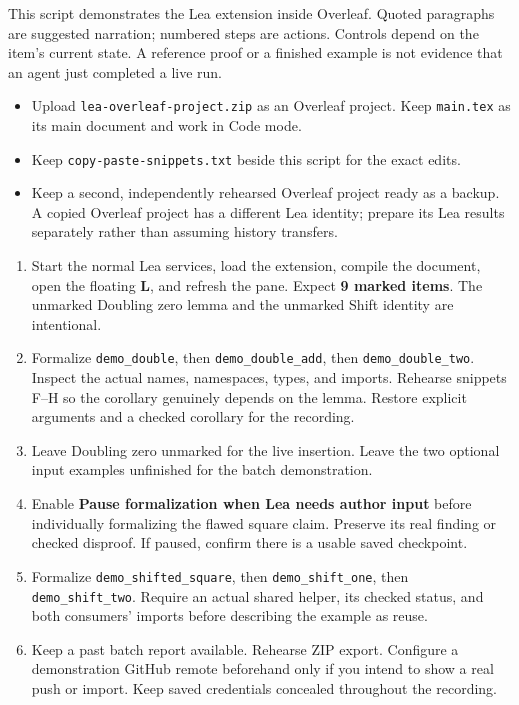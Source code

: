 
This script demonstrates the Lea extension inside Overleaf. Quoted paragraphs
are suggested narration; numbered steps are actions. Controls depend on the
item's current state. A reference proof or a finished example is not evidence
that an agent just completed a live run.

\begin{itemize}
  \item Upload \texttt{lea-overleaf-project.zip} as an Overleaf project. Keep
    \texttt{main.tex} as its main document and work in Code mode.
  \item Keep \texttt{copy-paste-snippets.txt} beside this script for the exact edits.
  \item Keep a second, independently rehearsed Overleaf project ready as a backup.
    A copied Overleaf project has a different Lea identity; prepare its Lea results
    separately rather than assuming history transfers.
\end{itemize}

\begin{enumerate}
  \item Start the normal Lea services, load the extension, compile the document,
    open the floating \textbf{L}, and refresh the pane. Expect \textbf{9 marked items}.
    The unmarked Doubling zero lemma and the unmarked Shift identity are intentional.
  \item Formalize \texttt{demo\_double}, then \texttt{demo\_double\_add}, then
    \texttt{demo\_double\_two}. Inspect the actual names, namespaces, types, and
    imports. Rehearse snippets F--H so the corollary genuinely depends on the lemma.
    Restore explicit arguments and a checked corollary for the recording.
  \item Leave Doubling zero unmarked for the live insertion. Leave the two optional
    input examples unfinished for the batch demonstration.
  \item Enable \textbf{Pause formalization when Lea needs author input} before
    individually formalizing the flawed square claim. Preserve its real finding
    or checked disproof. If paused, confirm there is a usable saved checkpoint.
  \item Formalize \texttt{demo\_shifted\_square}, then \texttt{demo\_shift\_one},
    then \texttt{demo\_shift\_two}. Require an actual shared helper, its checked
    status, and both consumers' imports before describing the example as reuse.
  \item Keep a past batch report available. Rehearse ZIP export. Configure a
    demonstration GitHub remote beforehand only if you intend to show a real push
    or import. Keep saved credentials concealed throughout the recording.
\end{enumerate}


